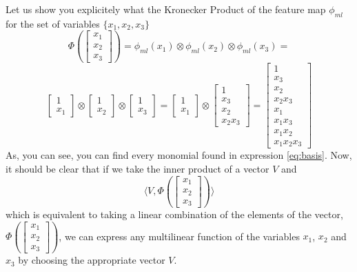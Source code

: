 \documentclass{article}
\theoremstyle{definition}
\theoremstyle{definition}
\begin{document}
Let us show you explicitely what the Kronecker Product of the feature map $\phi_{ml}$ for the set of variables $\{x_1, x_2, x_3\}$
\[
    \Phi(\begin{bmatrix}x_1 \\ x_2 \\ x_3 \end{bmatrix})
    =
    \phi_{ml}(x_1) \otimes \phi_{ml}(x_2) \otimes \phi_{ml}(x_3)
    =
\]
\[
\begin{bmatrix}
    1 \\ x_1
\end{bmatrix}
\otimes
\begin{bmatrix}
    1 \\ x_2
\end{bmatrix}
\otimes
\begin{bmatrix}
    1 \\ x_3
\end{bmatrix}
=
\begin{bmatrix}
    1 \\ x_1
\end{bmatrix}
\otimes
\begin{bmatrix}
    1 \\ x_3 \\ x_2 \\ x_2 x_3
\end{bmatrix}
=
\begin{bmatrix}
    1 \\ x_3 \\ x_2 \\ x_2 x_3 \\ x_1 \\ x_1 x_3 \\ x_1 x_2 \\ x_1 x_2 x_3
\end{bmatrix}
\]
As, you can see, you can find every monomial found in expression \ref{eq:basis}.
Now, it should be clear that if we take the inner product of a vector $V$ and 
\[
    \langle V,  \Phi \left(\begin{bmatrix}x_1 \\ x_2 \\ x_3 \end{bmatrix}\right) \rangle
\]
which is equivalent to taking a linear combination of the elements of the vector, 
$\Phi(\begin{bmatrix}x_1 \\ x_2 \\ x_3 \end{bmatrix})$, we can express any multilinear function of the variables $x_1$, $x_2$ and $x_3$ by choosing the appropriate vector $V$.
\end{document}
